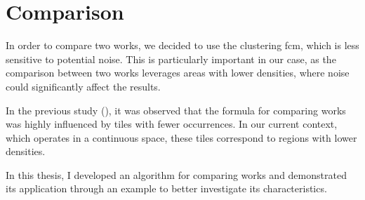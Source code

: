 \section{Comparison}
\begin{modified}
In order to compare two works, we decided to use the clustering \gls{fcm}, which is less sensitive to potential noise. This is particularly important in our case, as the comparison between two works leverages areas with lower densities, where noise could significantly affect the results.

\noindent In the previous study (\cite{thesis}), it was observed that the formula for comparing works was highly influenced by tiles with fewer occurrences. In our current context, which operates in a continuous space, these tiles correspond to regions with lower densities.

\noindent In this thesis, I developed an algorithm for comparing works and demonstrated its application through an example to better investigate its characteristics.
\end{modified}

